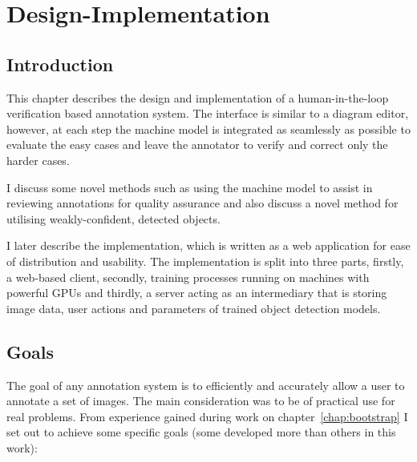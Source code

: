 \chapter{Design-Implementation}
\label{chap:design} 

\section{Introduction}

This chapter describes the design and implementation of a human-in-the-loop verification based annotation system. The interface is similar to a diagram editor, however, at each step the machine model is integrated as seamlessly as possible to evaluate the easy cases and leave the annotator to verify and correct only the harder cases. 

I discuss some novel methods such as using the machine model to assist in reviewing annotations for quality assurance and also discuss a novel method for utilising weakly-confident, detected objects.

I later describe the implementation, which is written as a web application for ease of distribution and usability. The implementation is split into three parts, firstly, a web-based client, secondly, training processes running on machines with powerful \gls{GPU}s and thirdly, a server acting as an intermediary that is storing image data, user actions and parameters of trained object detection models.

\section {Goals}

The goal of any annotation system is to efficiently and accurately allow a user to annotate a set of images. The main consideration was to be of practical use for real problems. From experience gained during work on chapter~\ref{chap:bootstrap} I set out to achieve some specific goals (some developed more than others in this work):

